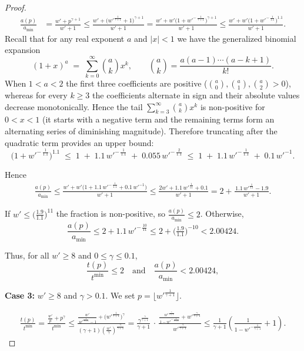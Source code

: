 \documentclass{article}
\begin{document}
\begin{proof}
\begin{align*}
\frac{a(p)}{a_{\min}} &= \frac{w'+p^{\gamma+1}}{w'+1}\le \frac{w'+\bigl(w'^{\frac{1}{\gamma+1}}+1\bigr)^{\gamma+1}}{w'+1}=   \frac{w'+w'\!\bigl(1+w'^{-\,\frac{1}{\gamma+1}}\bigr)^{\gamma+1}}{w'+1} \le \frac{w'+w'\!\bigl(1+w'^{-\,\frac{1}{1.1}}\bigr)^{1.1}}{w'+1}.
\end{align*}
Recall that for any real exponent $a$ and $|x|<1$ we have the generalized
binomial expansion
\[
(1+x)^a \;=\; \sum_{k=0}^{\infty} \binom{a}{k} x^{k},
\qquad
\binom{a}{k} = \frac{a(a-1)\cdots(a-k+1)}{k!}.
\]
When $1 < a < 2$ the first three coefficients are positive
($\binom{a}{0},\binom{a}{1},\binom{a}{2} > 0$),
whereas for every $k\ge 3$ the coefficients alternate in sign
and their absolute values decrease monotonically.
Hence the tail
\(
\sum_{k=3}^{\infty} \binom{a}{k} x^{k}
\)
is non-positive for $0 < x < 1$ (it starts with a negative term and the
remaining terms form an alternating series of diminishing magnitude).
Therefore truncating after the quadratic term provides an upper bound:
\[
\bigl(1+w'^{-\,\tfrac{1}{1.1}}\bigr)^{1.1}
   \;\le\;
   1 \;+\; 1.1\,w'^{-\,\tfrac{1}{1.1}}
   \;+\; 0.055\,w'^{-\,\tfrac{2}{1.1}}
   \;\le\;
   1 \;+\; 1.1\,w'^{-\,\tfrac{1}{1.1}}
   \;+\; 0.1\,w'^{-1}.
\]


Hence
\begin{align*}
\frac{a(p)}{a_{\min}} \le \frac{w'+w'\bigl(1+1.1\,w'^{-\,\frac{1}{1.1}}+0.1\,w'^{-1}\bigr)}{w'+1} \le \frac{2w'+1.1\,w'^{\frac{1}{11}}+0.1}{w'+1} =   2+\frac{\,1.1\,w'^{\frac{1}{11}}-1.9}{w'+1}.
\end{align*}

If \(w'\le \bigl(\tfrac{1.9}{1.1}\bigr)^{11}\) the fraction is non-positive,
so \(\frac{a(p)}{a_{\min}}\le 2\).
Otherwise,
\[
\frac{a(p)}{a_{\min}}
    \le 2+1.1\,w'^{-\,\frac{10}{11}}
    \le 2+\bigl(\tfrac{1.9}{1.1}\bigr)^{-10}
    < 2.00424.
\]

Thus, for all \(w'\ge 8\) and \(0\le\gamma\le0.1\),
\[
\frac{t(p)}{t^{\min}}\le 2
\quad\text{and}\quad
\frac{a(p)}{a_{\min}}<2.00424,
\]

\textbf{Case 3:}  $w' \ge 8$ and $\gamma > 0.1$.  
We set \(p=\bigl\lfloor w'^{\frac{1}{\gamma+1}}\bigr\rfloor\).

\begin{align*}
\frac{t(p)}{t^{\min}} = \frac{\tfrac{w'}{p}+p^\gamma}{t^{\min}} \le \frac{\displaystyle
              \frac{w'}{\,w'^{\frac{1}{\gamma+1}}-1}
              +\bigl(w'^{\frac{1}{\gamma+1}}\bigr)^{\gamma}}
            {(\gamma+1)\!\left(\frac{w'}{\gamma}\right)^{\frac{\gamma}{\gamma+1}}}= \frac{\gamma^{\frac{\gamma}{\gamma+1}}}{\gamma+1}
      \,\cdot\,
      \frac{\displaystyle
            \tfrac{w'^{\frac{\gamma}{\gamma+1}}}{1-w'^{-\frac{1}{\gamma+1}}}
            +w'^{\frac{\gamma}{\gamma+1}}}
           {w'^{\frac{\gamma}{\gamma+1}}} \le \frac{1}{\gamma+1}\!
      \left(\frac{1}{1-w'^{-\frac{1}{\gamma+1}}}+1\right).
\end{align*}


\end{proof}
\end{document}
